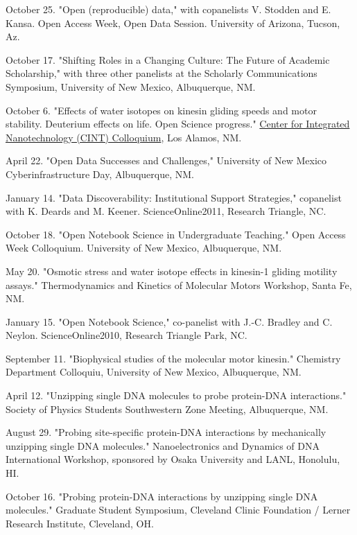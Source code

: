\documentclass[11pt]{article}
\begin{document}
\medskip

 October 25. "Open (reproducible) data," with copanelists V. Stodden and E. Kansa. Open Access Week, Open Data Session.  University of Arizona, Tucson, Az.

 October 17. "Shifting Roles in a Changing Culture: The Future of Academic Scholarship," with three other panelists at the Scholarly Communications Symposium, University of New Mexico, Albuquerque, NM.

 October 6. "Effects of water isotopes on kinesin gliding speeds and motor stability.  Deuterium effects on life.  Open Science progress." \href{http://goo.gl/XRjWQ}{Center for Integrated Nanotechnology (CINT) Colloquium}, Los Alamos, NM.

 April 22. "Open Data Successes and Challenges," University of New Mexico Cyberinfrastructure Day, Albuquerque, NM. 

 January 14. "Data Discoverability: Institutional Support Strategies," copanelist with K. Deards and M. Keener.  ScienceOnline2011, Research Triangle, NC.

 October 18. "Open Notebook Science in Undergraduate Teaching." Open Access Week Colloquium.  University of New Mexico, Albuquerque, NM.

 May 20. "Osmotic stress and water isotope effects in kinesin-1 gliding motility assays."  Thermodynamics and Kinetics of Molecular Motors Workshop, Santa Fe, NM.

 January 15. "Open Notebook Science," co-panelist with J.-C. Bradley and C. Neylon.  ScienceOnline2010, Research Triangle Park, NC.

 September 11. "Biophysical studies of the molecular motor kinesin." Chemistry Department Colloquiu, University of New Mexico, Albuquerque, NM.

 April 12. "Unzipping single DNA molecules to probe protein-DNA interactions." Society of Physics Students Southwestern Zone Meeting, Albuquerque, NM.

 August 29. "Probing site-specific protein-DNA interactions by mechanically unzipping single DNA molecules." Nanoelectronics and Dynamics of DNA International Workshop, sponsored by Osaka University and LANL, Honolulu, HI.

 October 16. "Probing protein-DNA interactions by unzipping single DNA molecules." Graduate Student Symposium, Cleveland Clinic Foundation / Lerner Research Institute, Cleveland, OH.
\end{document}
